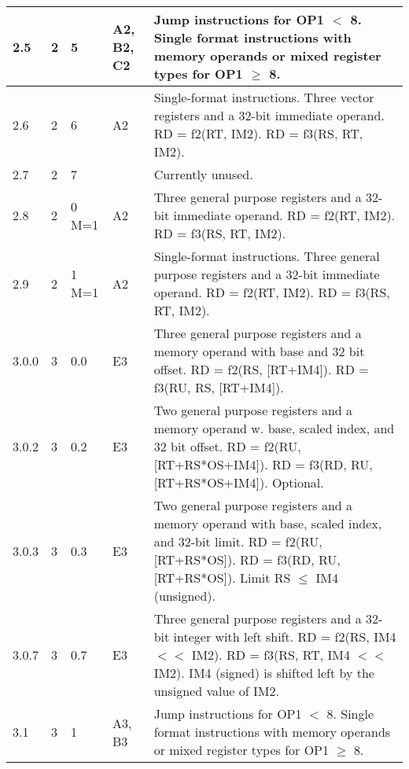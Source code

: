 \documentclass[forwardcom.tex]{subfiles}
\begin{document}
\begin{longtable} {|p{10mm}|p{6mm}|p{9mm}|p{7mm}|p{80mm}|}
\hline
2.5 & 2 & 5 & A2, B2, C2 & Jump instructions for OP1 $<$ 8. Single format instructions with memory operands or mixed register types for OP1 $\geq$ 8.\\

\hline
2.6 & 2 & 6 & A2 & Single-format instructions. Three vector registers and a 32-bit immediate operand.\newline 
RD = f2(RT, IM2). RD = f3(RS, RT, IM2).\\

\hline
2.7 & 2 & 7 &  & Currently unused.\\

\hline
2.8 & 2 & 0 M=1 & A2 & Three general purpose registers and a 32-bit immediate operand.\newline 
RD = f2(RT, IM2). RD = f3(RS, RT, IM2).\\

\hline
2.9 & 2 & 1 M=1 & A2 & Single-format instructions. Three general purpose registers and a 32-bit immediate operand.\newline 
RD = f2(RT, IM2). RD = f3(RS, RT, IM2).\\


\hline
3.0.0 & 3 & 0.0  & E3 & Three general purpose registers and a memory operand with base and 32 bit offset.\newline 
RD = f2(RS, [RT+IM4]). RD = f3(RU, RS, [RT+IM4]).\\

\hline
3.0.2 & 3 & 0.2  & E3 & Two general purpose registers and a memory operand w. base, scaled index, and 32 bit offset.\newline 
RD = f2(RU, [RT+RS*OS+IM4]). RD = f3(RD, RU, [RT+RS*OS+IM4]). Optional.\\


\hline
3.0.3 & 3 & 0.3  & E3 & Two general purpose registers and a memory operand with base, scaled index, and 32-bit limit.\newline 
RD = f2(RU, [RT+RS*OS]). RD = f3(RD, RU, [RT+RS*OS]). Limit RS $\leq$ IM4 (unsigned).\\

\hline
3.0.7 & 3 & 0.7  & E3 & Three general purpose registers and a 32-bit integer with left shift.\newline 
RD = f2(RS, IM4 $<<$ IM2). RD = f3(RS, RT, IM4 $<<$ IM2). 
IM4 (signed) is shifted left by the unsigned value of IM2. \\

\hline
3.1 & 3 & 1 & A3, B3 & Jump instructions for OP1 $<$ 8. Single format instructions with memory operands or mixed register types for OP1 $\geq$ 8.\\


\end{longtable}
\end{document}
